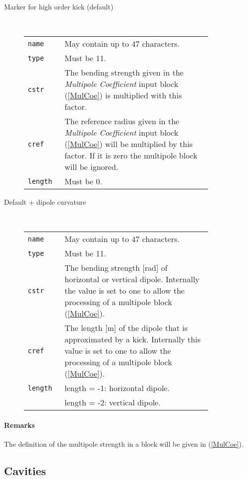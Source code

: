 \begin{description}
    \item [Marker for high order kick (default)]~
    
    \bigskip
    \begin{tabular}{@{}lp{0.8\linewidth}}
        \texttt{name} & May contain up to 47 characters. \\
        \texttt{type} & Must be 11. \\
        \texttt{cstr} & The bending strength given in the \textit{Multipole Coefficient} input block (\ref{MulCoe}) is multiplied with this factor.\\
        \texttt{cref} & The reference radius given in the \textit{Multipole Coefficient} input block (\ref{MulCoe}) will be multiplied by this factor. If it is zero the multipole block will be ignored.\\
        \texttt{length} & Must be 0.
    \end{tabular}
    \item [Default + dipole curvature]~
    
    \bigskip
    \begin{tabular}{@{}lp{0.8\linewidth}}
        \texttt{name} & May contain up to 47 characters. \\
        \texttt{type} & Must be 11. \\
        \texttt{cstr} & The bending strength [rad] of horizontal or vertical dipole. Internally the value is set to one to allow the processing of a multipole block (\ref{MulCoe}).\\
        \texttt{cref} & The length [m] of the dipole that is approximated by a kick. Internally this value is set to one to allow the processing of a multipole block (\ref{MulCoe}). \\
        \texttt{length} & length = -1: horizontal dipole. \\
                        & length = -2: vertical dipole.
    \end{tabular}
\end{description}

\paragraph{Remarks}
The definition of the multipole strength in a block will be given in (\ref{MulCoe}).

\subsection{Cavities} \label{Cavities}

